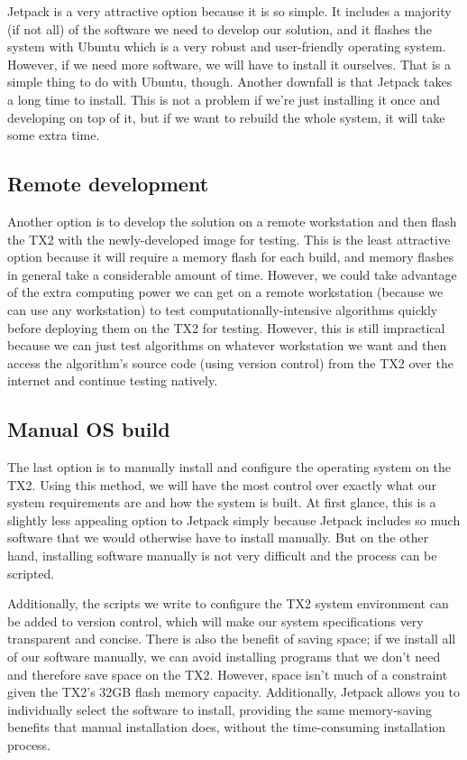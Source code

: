 \documentclass[letterpaper,10pt,serif,draftclsnofoot,onecolumn,compsoc,titlepage]{IEEEtran}
\begin{document}
Jetpack is a very attractive option because it is so simple. It includes a majority (if not all) of the software we need to develop our solution, and it flashes the system with Ubuntu which is a very robust and user-friendly operating system. However, if we need more software, we will have to install it ourselves. That is a simple thing to do with Ubuntu, though. Another downfall is that Jetpack takes a long time to install. This is not a problem if we’re just installing it once and developing on top of it, but if we want to rebuild the whole system, it will take some extra time.

\subsection{Remote development}
Another option is to develop the solution on a remote workstation and then flash the TX2 with the newly-developed image for testing. This is the least attractive option because it will require a memory flash for each build, and memory flashes in general take a considerable amount of time. However, we could take advantage of the extra computing power we can get on a remote workstation (because we can use any workstation) to test computationally-intensive algorithms quickly before deploying them on the TX2 for testing. However, this is still impractical because we can just test algorithms on whatever workstation we want and then access the algorithm’s source code (using version control) from the TX2 over the internet and continue testing natively.

\subsection{Manual OS build}
The last option is to manually install and configure the operating system on the TX2. Using this method, we will have the most control over exactly what our system requirements are and how the system is built. At first glance, this is a slightly less appealing option to Jetpack simply because Jetpack includes so much software that we would otherwise have to install manually. But on the other hand, installing software manually is not very difficult and the process can be scripted. 

Additionally, the scripts we write to configure the TX2 system environment can be added to version control, which will make our system specifications very transparent and concise. There is also the benefit of saving space; if we install all of our software manually, we can avoid installing programs that we don’t need and therefore save space on the TX2. However, space isn’t much of a constraint given the TX2’s 32GB flash memory capacity. Additionally, Jetpack allows you to individually select the software to install, providing the same memory-saving benefits that manual installation does, without the time-consuming installation process.
\end{document}

